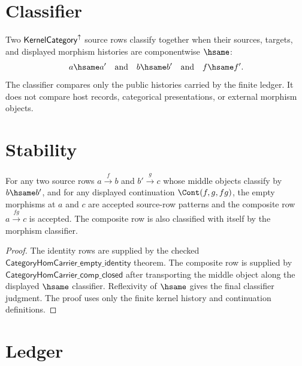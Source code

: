 \section{Classifier}
\label{sec:concrete-instances-kernel-as-category-classifier}

\begin{definition}
\label{def:concrete-instances-kernel-as-category-classifier}
Two $\mathsf{KernelCategory}^{\uparrow}$ source rows classify together when their sources,
targets, and displayed morphism histories are componentwise $\hsame$:
$$
\begin{aligned}
  a\hsame a'
  \quad\text{and}\quad
  b\hsame b'
  \quad\text{and}\quad
  f\hsame f'.
\end{aligned}
$$
The classifier compares only the public histories carried by the finite
ledger.  It does not compare host records, categorical presentations, or
external morphism objects.
\end{definition}

\section{Stability}
\label{sec:concrete-instances-kernel-as-category-stability}

\begin{theorem}
\label{thm:concrete-instances-kernel-as-category-stability}
For any two source rows $a\xrightarrow{f} b$ and $b'\xrightarrow{g} c$ whose
middle objects classify by $b\hsame b'$, and for any displayed continuation
$\Cont(f,g,fg)$, the empty morphisms at $a$ and $c$ are accepted source-row
patterns and the composite row $a\xrightarrow{fg} c$ is accepted.  The
composite row is also classified with itself by the morphism classifier.
\end{theorem}

\begin{proof}
The identity rows are supplied by the checked
$\mathsf{CategoryHomCarrier\_empty\_identity}$ theorem.  The composite row is
supplied by $\mathsf{CategoryHomCarrier\_comp\_closed}$ after transporting the
middle object along the displayed $\hsame$ classifier.  Reflexivity of
$\hsame$ gives the final classifier judgment.  The proof uses only the finite
kernel history and continuation definitions.
\end{proof}

\section{Ledger}
\label{sec:concrete-instances-kernel-as-category-ledger}

